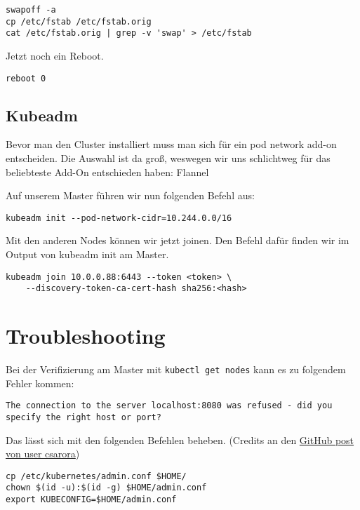\begin{lstlisting}
swapoff -a
cp /etc/fstab /etc/fstab.orig
cat /etc/fstab.orig | grep -v 'swap' > /etc/fstab
\end{lstlisting}

Jetzt noch ein Reboot.

\begin{lstlisting}
reboot 0
\end{lstlisting}

\hypertarget{kubeadm}{%
\subsection{Kubeadm}\label{kubeadm}}

Bevor man den Cluster installiert muss man sich für ein pod network
add-on entscheiden. Die Auswahl ist da groß, weswegen wir uns
schlichtweg für das beliebteste Add-On entschieden haben: Flannel

Auf unserem Master führen wir nun folgenden Befehl aus:

\begin{lstlisting}
kubeadm init --pod-network-cidr=10.244.0.0/16
\end{lstlisting}

Mit den anderen Nodes können wir jetzt joinen. Den Befehl dafür finden
wir im Output von kubeadm init am Master.

\begin{lstlisting}
kubeadm join 10.0.0.88:6443 --token <token> \
    --discovery-token-ca-cert-hash sha256:<hash>
\end{lstlisting}

\hypertarget{troubleshooting}{%
\section{Troubleshooting}\label{troubleshooting}}

Bei der Verifizierung am Master mit
\passthrough{\lstinline!kubectl get nodes!} kann es zu folgendem Fehler
kommen:

\begin{lstlisting}
The connection to the server localhost:8080 was refused - did you specify the right host or port?
\end{lstlisting}

Das lässt sich mit den folgenden Befehlen beheben. (Credits an den
\href{https://github.com/kubernetes/kubernetes/issues/44665\#issuecomment-295216655}{GitHub
post von user csarora})

\begin{lstlisting}
cp /etc/kubernetes/admin.conf $HOME/
chown $(id -u):$(id -g) $HOME/admin.conf
export KUBECONFIG=$HOME/admin.conf
\end{lstlisting}
